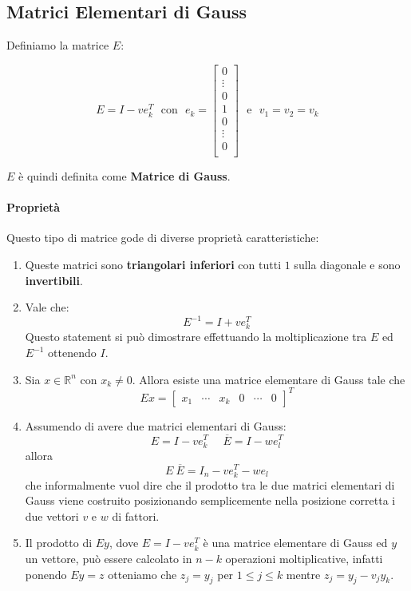 \documentclass{article}
\begin{document}
\subsection{Matrici Elementari di Gauss}

Definiamo la matrice $E$:

\[ E = I -ve^{T}_{k} \:\:\: \text{con} \:\:\: e_{k} = \begin{bmatrix}
    0 \\
    \vdots \\
    0 \\
    1 \\
    0 \\
    \vdots \\
    0 \\
    
\end{bmatrix}
\:\:\: \text{e} \:\:\: 
v_{1} = v_{2} = v_{k}
\]

$E$ è quindi definita come \textbf{Matrice di Gauss}.

\paragraph{Proprietà} Questo tipo di matrice gode di diverse proprietà caratteristiche:

\begin{enumerate}
    \item Queste matrici sono \textbf{triangolari inferiori} con tutti $1$ sulla diagonale e sono \textbf{invertibili}.
    \item Vale che:
    \vspace*{5px}
    \[ E^{-1} = I + ve^T_k \]
    \vspace*{5px}
    Questo statement si può dimostrare effettuando la moltiplicazione tra $E$ ed $E^{-1}$ ottenendo $I$.
    \item Sia $x \in \mathbb{R}^{n}$ con $x_{k} \neq 0$. Allora esiste una matrice elementare di Gauss tale che
    \[ Ex = {\begin{bmatrix}
        x_{1} & \cdots & x_{k} & 0 & \cdots & 0
    \end{bmatrix}}^{T} \]
    \newpage
    \item Assumendo di avere due matrici elementari di Gauss:
    \[ \boxed{E = I - ve^T_k} \:\:\:\:\:\: \boxed{\overline{E} = I - we^T_l} \]
    allora
    \[ \boxed{E \: \overline{E} = I_{n} - ve_{k}^{T} - we_{l}} \]
    che informalmente vuol dire che il prodotto tra le due matrici elementari di Gauss viene costruito posizionando
    semplicemente nella posizione corretta i due vettori $v$ e $w$ di fattori.
    \item Il prodotto di $Ey$, dove $E = I - ve_{k}^{T}$ è una matrice elementare di Gauss ed $y$ un vettore, può essere calcolato in $n-k$
    operazioni moltiplicative, infatti ponendo $Ey = z$ otteniamo che $z_{j} = y_{j}$ per $1 \leq j \leq k$ mentre $z_{j} = y_{j} - v_{j}y_{k}$.
\end{enumerate}
\end{document}
